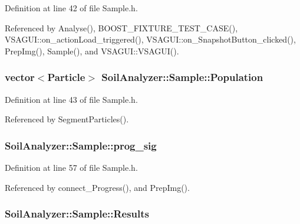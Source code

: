 Definition at line 42 of file Sample.\+h.



Referenced by Analyse(), B\+O\+O\+S\+T\+\_\+\+F\+I\+X\+T\+U\+R\+E\+\_\+\+T\+E\+S\+T\+\_\+\+C\+A\+S\+E(), V\+S\+A\+G\+U\+I\+::on\+\_\+action\+Load\+\_\+triggered(), V\+S\+A\+G\+U\+I\+::on\+\_\+\+Snapshot\+Button\+\_\+clicked(), Prep\+Img(), Sample(), and V\+S\+A\+G\+U\+I\+::\+V\+S\+A\+G\+U\+I().

\hypertarget{class_soil_analyzer_1_1_sample_ab87a190f2b4a49bc71b355f9c52d8aa4}{}
\subsubsection[{Population}]{\setlength{\rightskip}{0pt plus 5cm}vector$<${\bf Particle}$>$ Soil\+Analyzer\+::\+Sample\+::\+Population}\label{class_soil_analyzer_1_1_sample_ab87a190f2b4a49bc71b355f9c52d8aa4}


Definition at line 43 of file Sample.\+h.



Referenced by Segment\+Particles().

\hypertarget{class_soil_analyzer_1_1_sample_aab3a7522152890650245a1f069605a13}{}
\subsubsection[{prog\+\_\+sig}]{ Soil\+Analyzer\+::\+Sample\+::prog\+\_\+sig\hspace{0.3cm}{\ttfamily [private]}}\label{class_soil_analyzer_1_1_sample_aab3a7522152890650245a1f069605a13}


Definition at line 57 of file Sample.\+h.



Referenced by connect\+\_\+\+Progress(), and Prep\+Img().

\hypertarget{class_soil_analyzer_1_1_sample_ab242ae1c2f229168fd630a9f31d7237f}{}
\subsubsection[{Results}]{ Soil\+Analyzer\+::\+Sample\+::\+Results}\label{class_soil_analyzer_1_1_sample_ab242ae1c2f229168fd630a9f31d7237f}


